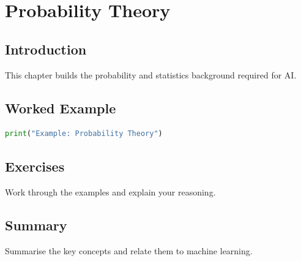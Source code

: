 \chapter{Probability Theory}
\label{chap:vol4-21}



\section{Introduction}
This chapter builds the probability and statistics background required for AI.

\section{Worked Example}
\begin{lstlisting}[language=Python]
print("Example: Probability Theory")
\end{lstlisting}

\section{Exercises}
\begin{exercise}
Work through the examples and explain your reasoning.
\end{exercise}

\section{Summary}
Summarise the key concepts and relate them to machine learning.
